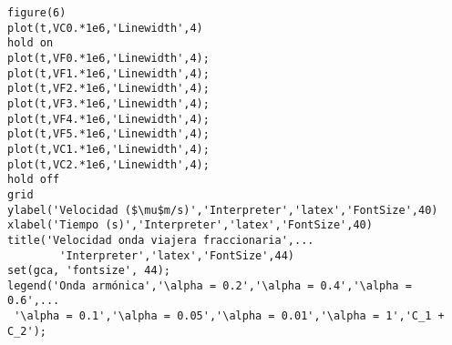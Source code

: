 \begin{lstlisting}[]
%% Representación de los resultados de velocidad de onda fraccionaria
figure(6)
plot(t,VC0.*1e6,'Linewidth',4)
hold on
plot(t,VF0.*1e6,'Linewidth',4);
plot(t,VF1.*1e6,'Linewidth',4);
plot(t,VF2.*1e6,'Linewidth',4);
plot(t,VF3.*1e6,'Linewidth',4);
plot(t,VF4.*1e6,'Linewidth',4);
plot(t,VF5.*1e6,'Linewidth',4);
plot(t,VC1.*1e6,'Linewidth',4);
plot(t,VC2.*1e6,'Linewidth',4);
hold off
grid
ylabel('Velocidad ($\mu$m/s)','Interpreter','latex','FontSize',40)
xlabel('Tiempo (s)','Interpreter','latex','FontSize',40)
title('Velocidad onda viajera fraccionaria',...
        'Interpreter','latex','FontSize',44)
set(gca, 'fontsize', 44);
legend('Onda armónica','\alpha = 0.2','\alpha = 0.4','\alpha = 0.6',...
 '\alpha = 0.1','\alpha = 0.05','\alpha = 0.01','\alpha = 1','C_1 + C_2');
 \end{lstlisting}
